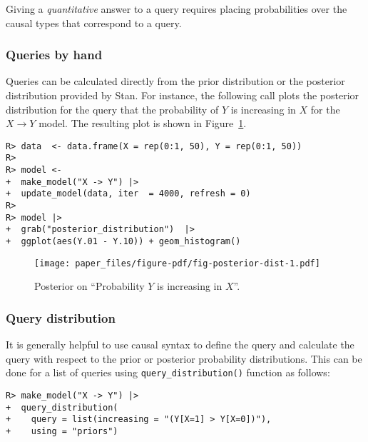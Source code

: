 \documentclass[
  11pt,
  article]{jss}
\begin{document}
Giving a \emph{quantitative} answer to a query requires placing
probabilities over the causal types that correspond to a query.

\hypertarget{queries-by-hand}{%
\subsubsection{Queries by hand}\label{queries-by-hand}}

Queries can be calculated directly from the prior distribution or the
posterior distribution provided by Stan. For instance, the following
call plots the posterior distribution for the query that the probability
of \(Y\) is increasing in \(X\) for the \(X \rightarrow Y\) model. The
resulting plot is shown in Figure~\ref{fig-posterior-dist}.

\begin{verbatim}
R> data  <- data.frame(X = rep(0:1, 50), Y = rep(0:1, 50))
R> 
R> model <- 
+  make_model("X -> Y") |>
+  update_model(data, iter  = 4000, refresh = 0)
R> 
R> model |> 
+  grab("posterior_distribution")  |> 
+  ggplot(aes(Y.01 - Y.10)) + geom_histogram() 
\end{verbatim}

\begin{figure}[t]

{\centering \texttt{[image: paper\_files/figure-pdf/fig-posterior-dist-1.pdf]}

}

\caption{\label{fig-posterior-dist}Posterior on ``Probability \(Y\) is
increasing in \(X\)''.}

\end{figure}

\FloatBarrier

\hypertarget{query-distribution}{%
\subsubsection{Query distribution}\label{query-distribution}}

It is generally helpful to use causal syntax to define the query and
calculate the query with respect to the prior or posterior probability
distributions. This can be done for a list of queries using
\texttt{query\_distribution()} function as follows:

\begin{verbatim}
R> make_model("X -> Y") |> 
+  query_distribution(
+    query = list(increasing = "(Y[X=1] > Y[X=0])"), 
+    using = "priors")
\end{verbatim}
\end{document}
